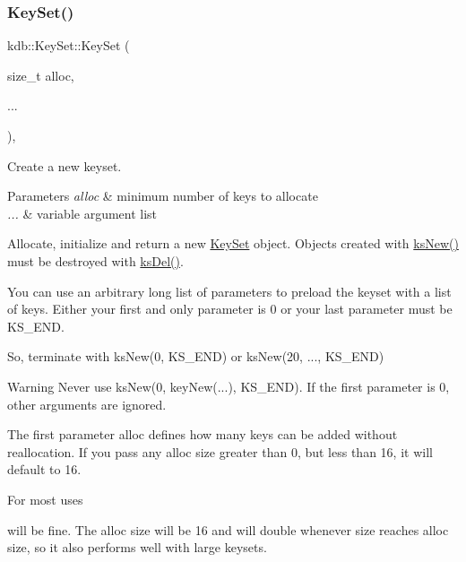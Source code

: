 \subsubsection{\texorpdfstring{KeySet()}{KeySet()}\hspace{0.1cm}{\footnotesize\ttfamily [4/5]}}
{\footnotesize\ttfamily kdb\+::\+Key\+Set\+::\+Key\+Set (\begin{DoxyParamCaption}\item[{size\+\_\+t}]{alloc,  }\item[{}]{... }\end{DoxyParamCaption})\hspace{0.3cm}{\ttfamily [inline]}, {\ttfamily [explicit]}}



Create a new keyset. 


\begin{DoxyParams}{Parameters}
{\em alloc} & minimum number of keys to allocate \\
\hline
{\em ...} & variable argument list\\
\hline
\end{DoxyParams}
Allocate, initialize and return a new \mbox{\hyperlink{classkdb_1_1KeySet}{Key\+Set}} object. Objects created with \mbox{\hyperlink{group__keyset_ga671e1aaee3ae9dc13b4834a4ddbd2c3c}{ks\+New()}} must be destroyed with \mbox{\hyperlink{group__keyset_ga27e5c16473b02a422238c8d970db7ac8}{ks\+Del()}}.

You can use an arbitrary long list of parameters to preload the keyset with a list of keys. Either your first and only parameter is 0 or your last parameter must be K\+S\+\_\+\+E\+ND.

So, terminate with ks\+New(0, K\+S\+\_\+\+E\+N\+D) or ks\+New(20, ..., K\+S\+\_\+\+E\+N\+D)

\begin{DoxyWarning}{Warning}
Never use ks\+New(0, key\+New(...), K\+S\+\_\+\+E\+N\+D). If the first parameter is 0, other arguments are ignored.
\end{DoxyWarning}
The first parameter {\ttfamily alloc} defines how many keys can be added without reallocation. If you pass any alloc size greater than 0, but less than 16, it will default to 16.

For most uses


\begin{DoxyCodeInclude}{0}
\DoxyCodeLine{\textcolor{comment}{// enough memory for up to 16 keys, without needing reallocation}}
\end{DoxyCodeInclude}
 will be fine. The alloc size will be 16 and will double whenever size reaches alloc size, so it also performs well with large keysets.

